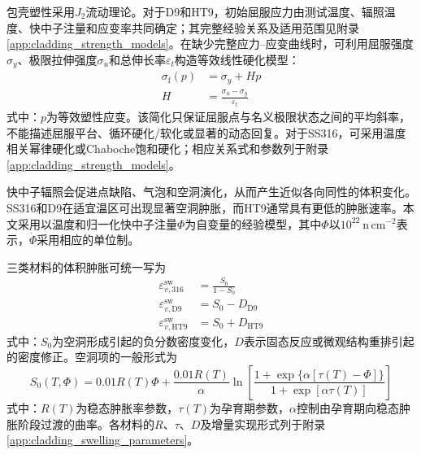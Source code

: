 包壳塑性采用$J_2$流动理论。对于D9和HT9，初始屈服应力由测试温度、辐照温度、快中子注量和应变率共同确定；其完整经验关系及适用范围见附录\ref{app:cladding_strength_models}。在缺少完整应力--应变曲线时，可利用屈服强度$\sigma_y$、极限拉伸强度$\sigma_u$和总伸长率$\varepsilon_t$构造等效线性硬化模型：
\begin{subequations}\label{eq:clad_linear_hardening}
	\begin{align}
		\sigma_{\mathrm f}(p)&=\sigma_y+Hp
		\label{eq:clad_flow_stress}\\
		H&=\frac{\sigma_u-\sigma_y}{\varepsilon_t}
		\label{eq:clad_hardening_modulus}
	\end{align}
\end{subequations}
式中：$p$为等效塑性应变。该简化只保证屈服点与名义极限状态之间的平均斜率，不能描述屈服平台、循环硬化/软化或显著的动态回复。对于SS316，可采用温度相关幂律硬化或Chaboche饱和硬化；相应关系式和参数列于附录\ref{app:cladding_strength_models}。

\label{sec:cladding_irradiation_swelling}

快中子辐照会促进点缺陷、气泡和空洞演化，从而产生近似各向同性的体积变化。SS316和D9在适宜温区可出现显著空洞肿胀，而HT9通常具有更低的肿胀速率。本文采用以温度和归一化快中子注量$\Phi$为自变量的经验模型，其中$\Phi$以$10^{22}\ \mathrm{n\,cm^{-2}}$表示，$\dot{\Phi}$采用相应的单位制\cite{halesBISONTheoryManual2016,hofmanMetallicFuelsHandbook2019}。

三类材料的体积肿胀可统一写为
\begin{subequations}\label{eq:clad_volumetric_swelling_models}
	\begin{align}
		\varepsilon_{v,316}^{\mathrm{sw}}
		&=\frac{S_0}{1-S_0}
		\label{eq:ss316_volumetric_swelling}\\
		\varepsilon_{v,\mathrm{D9}}^{\mathrm{sw}}
		&=S_0-D_{\mathrm{D9}}
		\label{eq:d9_volumetric_swelling}\\
		\varepsilon_{v,\mathrm{HT9}}^{\mathrm{sw}}
		&=S_0+D_{\mathrm{HT9}}
		\label{eq:ht9_volumetric_swelling}
	\end{align}
\end{subequations}
式中：$S_0$为空洞形成引起的负分数密度变化，$D$表示固态反应或微观结构重排引起的密度修正。空洞项的一般形式为
\begin{equation}
	S_0(T,\Phi)
	=0.01R(T)\Phi+
	\frac{0.01R(T)}{\alpha}
	\ln\!\left[
	\frac{1+\exp\{\alpha[\tau(T)-\Phi]\}}
	{1+\exp[\alpha\tau(T)]}
	\right]
	\label{eq:clad_void_swelling_inventory}
\end{equation}
式中：$R(T)$为稳态肿胀率参数，$\tau(T)$为孕育期参数，$\alpha$控制由孕育期向稳态肿胀阶段过渡的曲率。各材料的$R$、$\tau$、$D$及增量实现形式列于附录\ref{app:cladding_swelling_parameters}。

